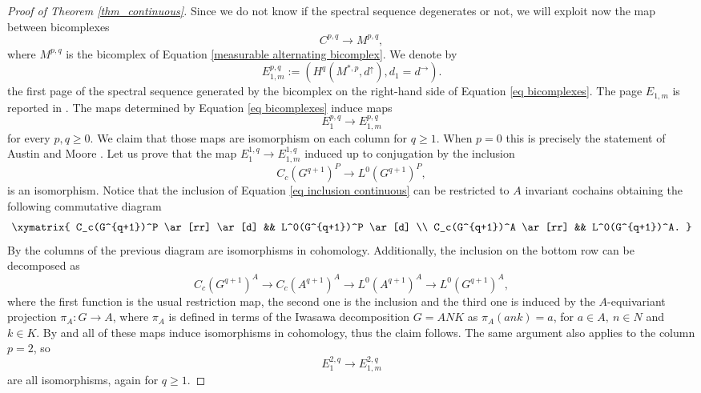 \documentclass[a4paper]{amsart}
\theoremstyle{definition}
\theoremstyle{remark}
\theoremstyle{TheoremNum}
\begin{document}
\begin{proof}[Proof of Theorem \ref{thm_continuous}]
Since we do not know if the spectral sequence degenerates or not, we will exploit now the map between bicomplexes
\begin{equation} \label{eq bicomplexes}
C^{p,q} \longrightarrow M^{p,q},
\end{equation}
where $M^{p,q}$ is the bicomplex of Equation \eqref{measurable alternating bicomplex}. We denote by
$$
E^{p,q}_{1,m}:=(H^q(M^{\ast,p},d^\uparrow),d_1=d^\rightarrow).
$$
the first page of the spectral sequence generated by the bicomplex on the right-hand side of Equation \eqref{eq bicomplexes}. The page $E_{1,m}$ is reported in \cite[Figure 3]{BucSavAlt}. The maps determined by Equation \eqref{eq bicomplexes} induce maps
\begin{equation}\label{eq first pages}
E_1^{p,q} \longrightarrow E_{1,m}^{p,q}
\end{equation}
for every $p,q \geq 0$. We claim that those maps are isomorphism on each column for $q \geq 1$. When $p=0$ this is precisely the statement of Austin and Moore \cite[Theorem A]{AM}. Let us prove that the map $E^{1,q}_1 \rightarrow E^{1,q}_{1,m}$ induced up to conjugation by the inclusion 
\begin{equation}\label{eq inclusion continuous}
C_c(G^{q+1})^P \longrightarrow L^0(G^{q+1})^P,
\end{equation}
is an isomorphism. Notice that the inclusion of Equation \eqref{eq inclusion continuous} can be restricted to $A$ invariant cochains obtaining the following commutative diagram
$$
\xymatrix{
C_c(G^{q+1})^P \ar[rr] \ar[d] && L^0(G^{q+1})^P \ar[d] \\
C_c(G^{q+1})^A \ar[rr] && L^0(G^{q+1})^A.
}
$$
By \cite[Proposition 3.1]{Monod} the columns of the previous diagram are isomorphisms in cohomology. Additionally, the inclusion on the bottom row can be decomposed as
$$
C_c(G^{q+1})^A \rightarrow C_c(A^{q+1})^A \rightarrow L^0(A^{q+1})^A \rightarrow L^0(G^{q+1})^A,
$$
where the first function is the usual restriction map, the second one is the inclusion and the third one is induced by the $A$-equivariant projection $\pi_A:G \rightarrow A$, where $\pi_A$ is defined in terms of the Iwasawa decomposition $G=ANK$ as $\pi_A(ank)=a$, for $a\in A,\ n\in N$ and $k\in K$.  By \cite[Theorem A]{AM} and \cite[Theorem 2]{Moore} all of these maps induce isomorphisms in cohomology, thus the claim follows. The same argument also applies to the column $p=2$, so 
$$
E^{2,q}_1 \longrightarrow E^{2,q}_{1,m}
$$
are all isomorphisms, again for $q \geq 1$. 


\end{proof}
\end{document}
